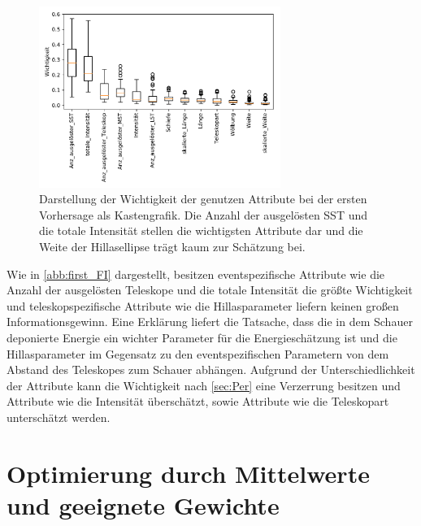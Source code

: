\begin{figure}
  \includegraphics[width=0.7\textwidth]{Plots/feautureimportance_boxplot_firstForest.pdf}
  \centering
  \caption{Darstellung der Wichtigkeit der genutzen Attribute bei der ersten Vorhersage als Kastengrafik. Die Anzahl der ausgelösten SST und die totale Intensität
          stellen die wichtigsten Attribute dar und die Weite der Hillasellipse trägt kaum zur Schätzung bei.}
  \label{abb:first_FI}
\end{figure}
Wie in \autoref{abb:first_FI} dargestellt, besitzen eventspezifische Attribute wie die Anzahl der ausgelösten Teleskope und die totale Intensität die größte Wichtigkeit und teleskopspezifische Attribute
wie die Hillasparameter liefern keinen großen Informationsgewinn.
Eine Erklärung liefert die Tatsache, dass die in dem Schauer deponierte Energie ein wichter Parameter für die Energieschätzung ist und die Hillasparameter im
Gegensatz zu den eventspezifischen Parametern von dem Abstand des Teleskopes zum Schauer abhängen.
Aufgrund der Unterschiedlichkeit der Attribute kann die Wichtigkeit nach \autoref{sec:Per} eine Verzerrung besitzen und Attribute
wie die Intensität überschätzt, sowie Attribute wie die Teleskopart unterschätzt werden.

\section{Optimierung durch Mittelwerte und geeignete Gewichte}

